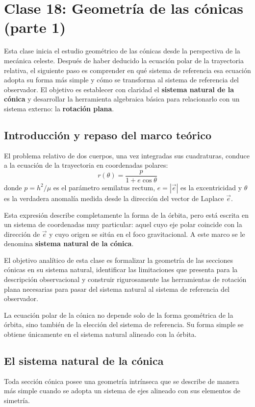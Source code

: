\chapter{Clase 18: Geometría de las cónicas (parte 1)}

Esta clase inicia el estudio geométrico de las cónicas desde la perspectiva de la mecánica celeste. Después de haber deducido la ecuación polar de la trayectoria relativa, el siguiente paso es comprender en qué sistema de referencia esa ecuación adopta su forma más simple y cómo se transforma al sistema de referencia del observador. El objetivo es establecer con claridad el \textbf{sistema natural de la cónica} y desarrollar la herramienta algebraica básica para relacionarlo con un sistema externo: la \textbf{rotación plana}.

\section{Introducción y repaso del marco teórico}
El problema relativo de dos cuerpos, una vez integradas sus cuadraturas, conduce a la ecuación de la trayectoria en coordenadas polares:
\[
 r(\theta) = \frac{p}{1 + e\cos\theta}
\]
donde \(p = h^2/\mu\) es el parámetro semilatus rectum, \(e = |\vec{e}|\) es la excentricidad y \(\theta\) es la verdadera anomalía medida desde la dirección del vector de Laplace \(\vec{e}\).

Esta expresión describe completamente la forma de la órbita, pero está escrita en un sistema de coordenadas muy particular: aquel cuyo eje polar coincide con la dirección de \(\vec{e}\) y cuyo origen se sitúa en el foco gravitacional. A este marco se le denomina \textbf{sistema natural de la cónica}.

El objetivo analítico de esta clase es formalizar la geometría de las secciones cónicas en su sistema natural, identificar las limitaciones que presenta para la descripción observacional y construir rigurosamente las herramientas de rotación plana necesarias para pasar del sistema natural al sistema de referencia del observador.

\begin{importante}
La ecuación polar de la cónica no depende solo de la forma geométrica de la órbita, sino también de la elección del sistema de referencia. Su forma simple se obtiene únicamente en el sistema natural alineado con la órbita.
\end{importante}

\section{El sistema natural de la cónica}
Toda sección cónica posee una geometría intrínseca que se describe de manera más simple cuando se adopta un sistema de ejes alineado con sus elementos de simetría.

